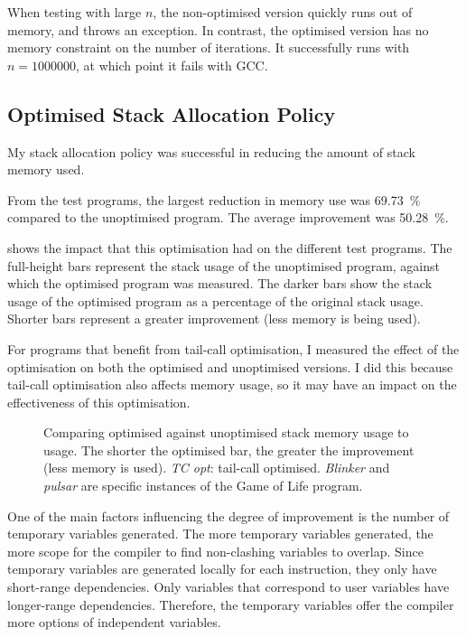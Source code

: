 \documentclass[00-main.tex]{subfiles}
\begin{document}
When testing with large $n$, the non-optimised version quickly runs out of memory, and throws an exception.
In contrast, the optimised version has no memory constraint on the number of iterations.
It successfully runs with $n = \num{1000000}$, at which point it fails with GCC\@.


\subsection{Optimised Stack Allocation Policy}\label{sec:eval:optimised stack allocation}

My stack allocation policy was successful in reducing the amount of stack memory used.

From the test programs, the largest reduction in memory use was \SI{69.73}{\percent} compared to the unoptimised program.
The average improvement was \SI{50.28}{\percent}.

 shows the impact that this optimisation had on the different test programs.
The full-height bars represent the stack usage of the unoptimised program, against which the optimised program was measured.
The darker bars show the stack usage of the optimised program as a percentage of the original stack usage.
Shorter bars represent a greater improvement (less memory is being used).

For programs that benefit from tail-call optimisation, I measured the effect of the optimisation on both the optimised and unoptimised versions.
I did this because tail-call optimisation also affects memory usage, so it may have an impact on the effectiveness of this optimisation.

\begin{figure}[t]
  \centering
  \caption{Comparing optimised against unoptimised stack memory usage to usage. The shorter the optimised bar, the greater the improvement (less memory is used). \emph{TC opt}: tail-call optimised. \emph{Blinker} and \emph{pulsar} are specific instances of the Game of Life program.}%
  \label{fig:comparing stack usage optimisation across programs}
\end{figure}

One of the main factors influencing the degree of improvement is the number of temporary variables generated.
The more temporary variables generated, the more scope for the compiler to find non-clashing variables to overlap.
Since temporary variables are generated locally for each instruction, they only have short-range dependencies.
Only variables that correspond to user variables have longer-range dependencies.
Therefore, the temporary variables offer the compiler more options of independent variables.
\end{document}
